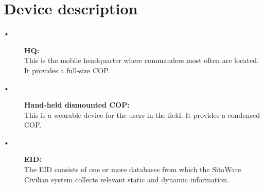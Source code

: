 \section{Device description}

\begin{description}
  \item[•] \textbf{HQ:}\\ 
  This is the mobile headquarter where commanders most often are located. It provides a full-size COP.

  \item[•] \textbf{Hand-held dismounted COP:}\\ 
  This is a wearable device for the users in the field. It provides a condensed COP.

  \item[•] \textbf{EID:}\\
  The EID consists of one or more databases from which the SitaWare Civilian system collects relevant static and dynamic information. 
\end{description}